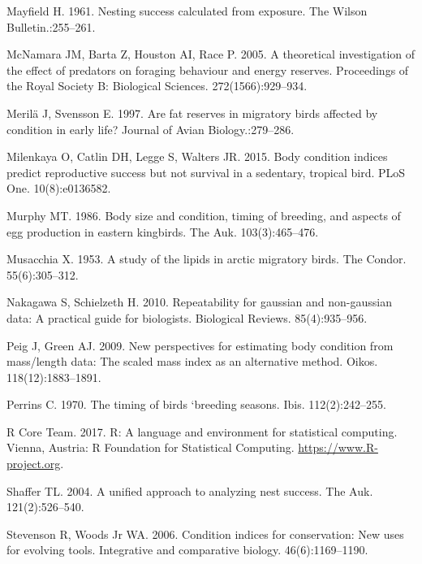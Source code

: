 \documentclass[
]{article}
\begin{document}
\leavevmode\hypertarget{ref-mayfield1961nesting}{}%
Mayfield H. 1961. Nesting success calculated from exposure. The Wilson
Bulletin.:255--261.

\leavevmode\hypertarget{ref-mcnamara2005theoretical}{}%
McNamara JM, Barta Z, Houston AI, Race P. 2005. A theoretical
investigation of the effect of predators on foraging behaviour and
energy reserves. Proceedings of the Royal Society B: Biological
Sciences. 272(1566):929--934.

\leavevmode\hypertarget{ref-merila1997fat}{}%
Merilä J, Svensson E. 1997. Are fat reserves in migratory birds affected
by condition in early life? Journal of Avian Biology.:279--286.

\leavevmode\hypertarget{ref-milenkaya2015body}{}%
Milenkaya O, Catlin DH, Legge S, Walters JR. 2015. Body condition
indices predict reproductive success but not survival in a sedentary,
tropical bird. PLoS One. 10(8):e0136582.

\leavevmode\hypertarget{ref-murphy1986body}{}%
Murphy MT. 1986. Body size and condition, timing of breeding, and
aspects of egg production in eastern kingbirds. The Auk.
103(3):465--476.

\leavevmode\hypertarget{ref-musacchia1953study}{}%
Musacchia X. 1953. A study of the lipids in arctic migratory birds. The
Condor. 55(6):305--312.

\leavevmode\hypertarget{ref-nakagawa2010repeatability}{}%
Nakagawa S, Schielzeth H. 2010. Repeatability for gaussian and
non-gaussian data: A practical guide for biologists. Biological Reviews.
85(4):935--956.

\leavevmode\hypertarget{ref-peig2009new}{}%
Peig J, Green AJ. 2009. New perspectives for estimating body condition
from mass/length data: The scaled mass index as an alternative method.
Oikos. 118(12):1883--1891.

\leavevmode\hypertarget{ref-perrins1970timing}{}%
Perrins C. 1970. The timing of birds `breeding seasons. Ibis.
112(2):242--255.

\leavevmode\hypertarget{ref-rcoreteam}{}%
R Core Team. 2017. R: A language and environment for statistical
computing. Vienna, Austria: R Foundation for Statistical Computing.
\url{https://www.R-project.org}.

\leavevmode\hypertarget{ref-shaffer2004unified}{}%
Shaffer TL. 2004. A unified approach to analyzing nest success. The Auk.
121(2):526--540.

\leavevmode\hypertarget{ref-stevenson2006condition}{}%
Stevenson R, Woods Jr WA. 2006. Condition indices for conservation: New
uses for evolving tools. Integrative and comparative biology.
46(6):1169--1190.
\end{document}
